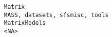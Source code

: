 \documentclass[
  letterpaper,
  DIV=11,
  numbers=noendperiod]{scrreprt}
\begin{document}
\begin{verbatim}
Matrix                                                                                                                                                                                                                                                                                                                                                                                                                                                                                                                                                                                                                                                                                                                                                                                                                                                                                                                                                                                                                                                                                                                                                                                                                                                                         MASS, datasets, sfsmisc, tools
MatrixModels                                                                                                                                                                                                                                                                                                                                                                                                                                                                                                                                                                                                                                                                                                                                                                                                                                                                                                                                                                                                                                                                                                                                                                                                                                                                                             <NA>

\end{verbatim}
\end{document}
